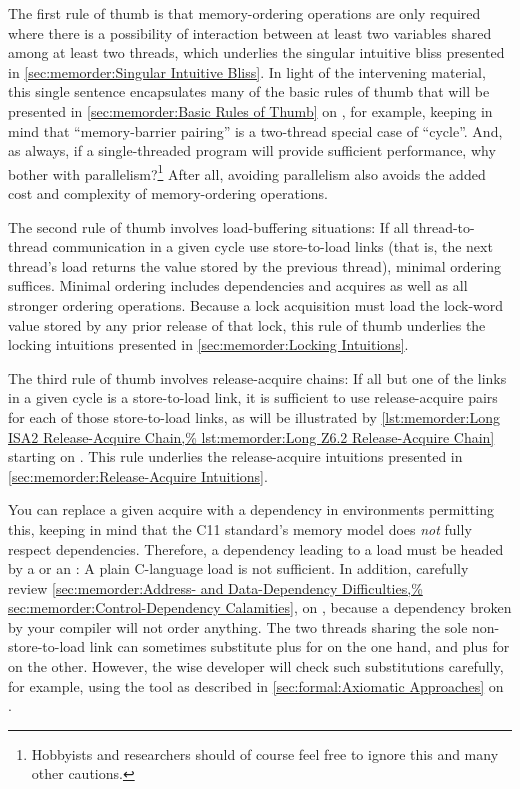 The first rule of thumb is that memory-ordering operations are only
required where there is a possibility of interaction between at least
two variables shared among at least two threads, which underlies the
singular intuitive bliss presented in
\cref{sec:memorder:Singular Intuitive Bliss}.
In light of the intervening material, this single sentence encapsulates
many of the basic rules of thumb that will be presented in
\cref{sec:memorder:Basic Rules of Thumb}
on
,
for example, keeping in mind that ``memory-barrier pairing'' is a
two-thread special case of ``cycle''.
And, as always, if a single-threaded program will provide sufficient
performance, why bother with parallelism?\footnote{
	Hobbyists and researchers should of course feel free to ignore
	this and many other cautions.}
After all, avoiding parallelism also avoids the added cost and complexity
of memory-ordering operations.

The second rule of thumb involves load-buffering situations:
If all thread-to-thread communication in a given cycle use store-to-load
links (that is, the next thread's load returns the value stored by
the previous thread), minimal ordering suffices.
Minimal ordering includes dependencies and acquires as well as all stronger
ordering operations.
Because a lock acquisition must load the lock-word value stored by any
prior release of that lock, this rule of thumb underlies the locking
intuitions presented in
\cref{sec:memorder:Locking Intuitions}.

The third rule of thumb involves release-acquire chains:
If all but one of the links in a given cycle is a store-to-load
link, it is sufficient to use release-acquire pairs for each of
those store-to-load links, as will be illustrated by
\cref{lst:memorder:Long ISA2 Release-Acquire Chain,%
lst:memorder:Long Z6.2 Release-Acquire Chain}
starting on
.
This rule underlies the release-acquire intuitions presented in
\cref{sec:memorder:Release-Acquire Intuitions}.

You can replace a given acquire with a dependency in environments permitting
this, keeping in mind that the C11 standard's memory model does \emph{not}
fully respect dependencies.
Therefore, a dependency leading to a load must be headed by
a  or an :
A plain C-language load is not sufficient.
In addition, carefully review
\cref{sec:memorder:Address- and Data-Dependency Difficulties,%
sec:memorder:Control-Dependency Calamities},
on
,
because a dependency broken by your compiler will not order anything.
The two threads sharing the sole non-store-to-load link can
sometimes substitute  plus  for
 on the one hand,
and  plus  for 
on the other.
However, the wise developer will check such substitutions carefully,
for example, using the  tool as described in
\cref{sec:formal:Axiomatic Approaches}
on
.


